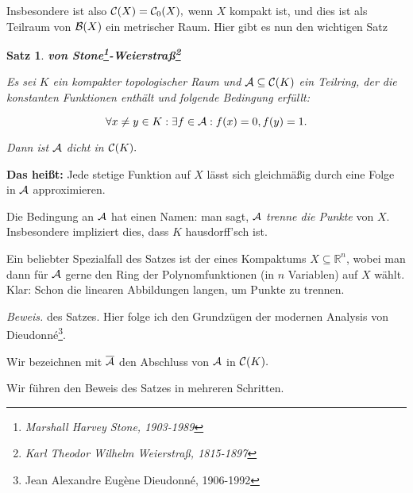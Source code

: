 \documentclass[12pt]{scrbook}   %
\newtheorem{satzX}[alles]{Satz}
\newenvironment{satz}[1]{\begin{satzX}{\bf #1}\par}{\end{satzX}}
\begin{document}
Insbesondere ist also ${\cal C}(X) = {\cal C}_0(X),$ wenn $X$ kompakt ist, und 
dies ist als Teilraum von ${\cal B}(X)$ ein metrischer Raum. Hier gibt es nun 
den wichtigen Satz 

\begin{satz} {\bf von Stone\footnote{Marshall Harvey Stone, 1903-1989}-Weierstra\ss\footnote{Karl Theodor Wilhelm Weierstra\ss, 1815-1897}}

Es sei $K$ ein kompakter topologischer Raum und ${\cal A}\subseteq {\cal C}(K)$
ein Teilring, der die konstanten Funktionen enthält und folgende Bedingung 
erfüllt:

$$\forall x\neq y\in K:\exists f\in {\cal A}:f(x)=0, f(y)=1.$$

Dann ist $\cal A$ dicht in ${\cal C}(K).$

\end{satz}

{\bf Das heißt:} Jede stetige Funktion auf $X$ lässt sich gleichmäßig
durch eine Folge in ${\cal A}$ approximieren. 

Die Bedingung an ${\cal A}$ hat einen Namen: man sagt, ${\cal A} $ 
{\it trenne die Punkte} von $X.$
Insbesondere impliziert dies, dass $K$ hausdorff'sch ist.

Ein beliebter Spezialfall des
Satzes ist der eines Kompaktums $X\subseteq \mathbb R^n$, wobei man dann für
${\cal A}$ gerne den Ring der Polynomfunktionen (in $n$ Variablen) auf $X$ 
wählt. Klar: Schon die linearen Abbildungen langen, um Punkte zu trennen.

{\it Beweis.} des Satzes. Hier folge ich den Grundzügen der modernen Analysis
von Dieudonn\'e\footnote{Jean Alexandre Eug\`ene Dieudonn\'e, 1906-1992}.

Wir bezeichnen mit $\overline{\cal A}$ den Abschluss von $\cal A$ in 
${\cal C}(K).$

Wir führen den Beweis des Satzes in mehreren Schritten.
\end{document}

